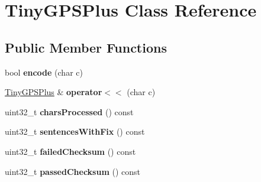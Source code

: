 \hypertarget{class_tiny_g_p_s_plus}{}\section{Tiny\+G\+P\+S\+Plus Class Reference}
\label{class_tiny_g_p_s_plus}
\subsection*{Public Member Functions}
\begin{DoxyCompactItemize}
\item 
bool {\bfseries encode} (char c)\hypertarget{class_tiny_g_p_s_plus_ad7b78320b7e4967df17c6a27008a5154}{}\label{class_tiny_g_p_s_plus_ad7b78320b7e4967df17c6a27008a5154}

\item 
\hyperlink{class_tiny_g_p_s_plus}{Tiny\+G\+P\+S\+Plus} \& {\bfseries operator$<$$<$} (char c)\hypertarget{class_tiny_g_p_s_plus_a32a0b61a25ce0c490216cb2b4ea19ced}{}\label{class_tiny_g_p_s_plus_a32a0b61a25ce0c490216cb2b4ea19ced}

\item 
uint32\+\_\+t {\bfseries chars\+Processed} () const \hypertarget{class_tiny_g_p_s_plus_a12b6bc0169ee6b2f0beb8041e549f338}{}\label{class_tiny_g_p_s_plus_a12b6bc0169ee6b2f0beb8041e549f338}

\item 
uint32\+\_\+t {\bfseries sentences\+With\+Fix} () const \hypertarget{class_tiny_g_p_s_plus_a6c502ec591dc42a83771a502c4dbdcd4}{}\label{class_tiny_g_p_s_plus_a6c502ec591dc42a83771a502c4dbdcd4}

\item 
uint32\+\_\+t {\bfseries failed\+Checksum} () const \hypertarget{class_tiny_g_p_s_plus_a57dd7a4430d58f784e967ee2d76e574f}{}\label{class_tiny_g_p_s_plus_a57dd7a4430d58f784e967ee2d76e574f}

\item 
uint32\+\_\+t {\bfseries passed\+Checksum} () const \hypertarget{class_tiny_g_p_s_plus_a55af5d3442bf8f5c5fdd0309e416d9e5}{}\label{class_tiny_g_p_s_plus_a55af5d3442bf8f5c5fdd0309e416d9e5}

\end{DoxyCompactItemize}
